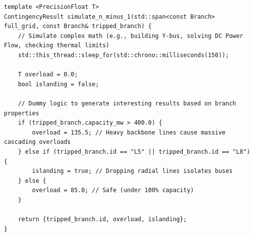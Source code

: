 \begin{verbatim}
template <PrecisionFloat T>
ContingencyResult simulate_n_minus_1(std::span<const Branch> full_grid, const Branch& tripped_branch) {
    // Simulate complex math (e.g., building Y-bus, solving DC Power Flow, checking thermal limits)
    std::this_thread::sleep_for(std::chrono::milliseconds(150)); 
    
    T overload = 0.0;
    bool islanding = false;
    
    // Dummy logic to generate interesting results based on branch properties
    if (tripped_branch.capacity_mw > 400.0) {
        overload = 135.5; // Heavy backbone lines cause massive cascading overloads
    } else if (tripped_branch.id == "L5" || tripped_branch.id == "L8") {
        islanding = true; // Dropping radial lines isolates buses
    } else {
        overload = 85.0; // Safe (under 100% capacity)
    }
    
    return {tripped_branch.id, overload, islanding};
}
\end{verbatim}
